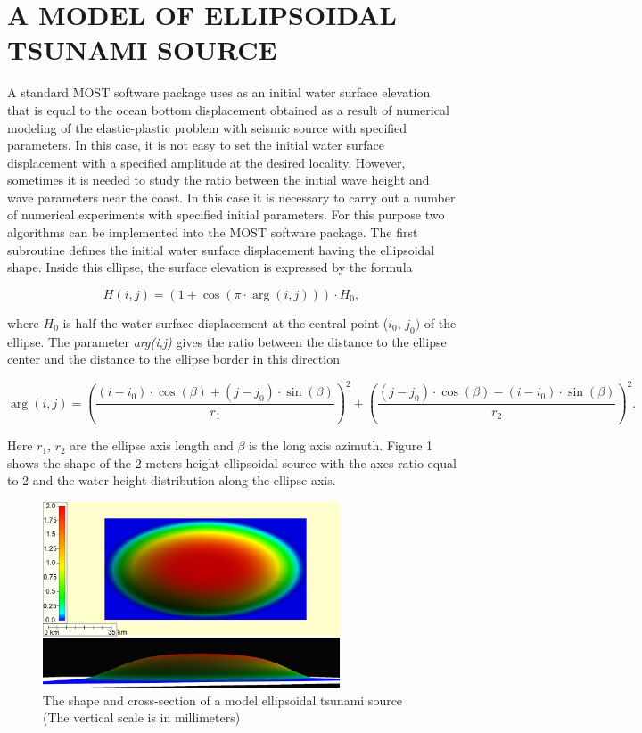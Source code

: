 \documentclass{aip-cp}
\begin{document}
\section{A MODEL OF ELLIPSOIDAL TSUNAMI SOURCE}
A standard MOST software package uses as an initial water surface elevation 
that is equal to the ocean bottom displacement obtained as a result of 
numerical modeling of the elastic-plastic problem with seismic source with 
specified parameters. In this case, it is not easy to set the initial water 
surface displacement with a specified amplitude at the desired locality. 
However, sometimes it is needed to study the ratio between the initial wave 
height and wave parameters near the coast. In this case it is necessary to 
carry out a number of numerical experiments with specified initial 
parameters. For this purpose two algorithms can be implemented into the MOST 
software package. The first subroutine defines the initial water surface 
displacement having the ellipsoidal shape. Inside this ellipse, the surface 
elevation is expressed by the formula

\begin{equation}
\label{eq5}
H(i,j) = \left( {1 + \cos (\pi \cdot \arg (i,j))} \right) \cdot H_0 ,
\end{equation}

\noindent
where $H_{0}$ is half the water surface displacement at the central point 
($i_{0}$, $j_{0})$ of the ellipse. The parameter \textit{arg(i,j)} gives the ratio between the 
distance to the ellipse center and the distance to the ellipse border in 
this direction

\begin{equation}
\label{eq6}
\arg (i,j) = \left( {\frac{(i - i_0 ) \cdot \cos (\beta ) + (j - j_0 ) \cdot 
\sin (\beta )}{r_1 }} \right)^2 + \left( {\frac{(j - j_0 ) \cdot \cos (\beta 
) - (i - i_0 ) \cdot \sin (\beta )}{r_2 }} \right)^2.
\end{equation}

Here $r_{1}$, $r_{2}$ are the ellipse axis length and \textit{$\beta $} is the long axis 
azimuth. Figure 1 shows the shape of the 2 meters height ellipsoidal source 
with the axes ratio equal to 2 and the water height distribution along the 
ellipse axis.

\begin{figure}[ht]
  \centerline{\includegraphics[width=250pt]{art/Fig_01.png}}
  \caption{The shape and cross-section of a model ellipsoidal tsunami source
(The vertical scale is in millimeters)}
\end{figure}
\end{document}
